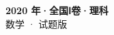 \documentclass[zihao=-4, a4paper]{ctexart}
\begin{document}
\begin{center}
  {\Large\bfseries 2020 年·全国Ⅰ卷·理科}\\[4pt]
  {\large 数学 · 试题版}
\end{center}
\medskip
{}

\end{document}

